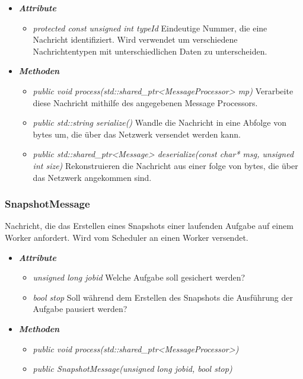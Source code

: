 \documentclass[a4paper,12pt]{article}
\begin{document}
	\begin{itemize}[label={}]

	\item\textit{\textbf{Attribute}}
		\begin{itemize}[label={\textbullet}]
			\item\textit{protected const unsigned int typeId} Eindeutige Nummer, die eine Nachricht identifiziert. Wird verwendet um verschiedene Nachrichtentypen mit unterschiedlichen Daten zu unterscheiden.
			
		\end{itemize}

	\item\textit{\textbf{Methoden}}
		\begin{itemize}[label={\textbullet}]
			\item\textit{public void process(std::shared\_ptr<MessageProcessor> mp)} Verarbeite diese Nachricht mithilfe des angegebenen Message Processors.
			\item\textit{public std::string serialize()} Wandle die Nachricht in eine Abfolge von bytes um, die über das Netzwerk versendet werden kann.
			\item\textit{public std::shared\_ptr<Message> deserialize(const char* msg, unsigned int size)} Rekonstruieren die Nachricht aus einer folge von bytes, die über das Netzwerk angekommen sind.

		\end{itemize}

\end{itemize}


\subsubsection{SnapshotMessage}

Nachricht, die das Erstellen eines Snapshots einer laufenden Aufgabe auf einem Worker anfordert. Wird vom Scheduler an einen Worker versendet.

	\begin{itemize}[label={}]

	\item\textit{\textbf{Attribute}}
		\begin{itemize}[label={\textbullet}]
			\item\textit{unsigned long jobid} Welche Aufgabe soll gesichert werden?
			\item\textit{bool stop} Soll während dem Erstellen des Snapshots die Ausführung der Aufgabe pausiert werden?
			
		\end{itemize}

	\item\textit{\textbf{Methoden}}
		\begin{itemize}[label={\textbullet}]
			\item\textit{public void process(std::shared\_ptr<MessageProcessor>)}
			\item\textit{public SnapshotMessage(unsigned long jobid, bool stop)}

		\end{itemize}

\end{itemize}
\end{document}
